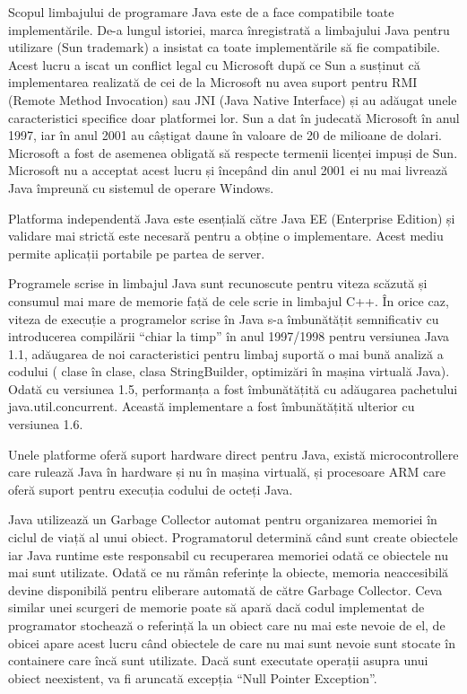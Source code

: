\documentclass[12pt]{book}
\begin{document}
Scopul limbajului de programare Java este de a face compatibile toate implementările. De-a lungul istoriei, marca înregistrată a limbajului Java pentru utilizare (Sun trademark) a insistat ca toate implementările să fie compatibile. Acest lucru a iscat un conflict legal cu Microsoft după ce Sun a susținut că implementarea realizată de cei de la Microsoft nu avea suport pentru RMI (Remote Method Invocation) sau JNI (Java Native Interface) și au adăugat unele caracteristici specifice doar platformei lor. Sun a dat în judecată Microsoft în anul 1997, iar în anul 2001 au câștigat daune în valoare de 20 de milioane de dolari. Microsoft a fost de asemenea obligată să respecte termenii licenței impuși de Sun. Microsoft nu a acceptat acest lucru și începând din anul 2001 ei nu mai livrează Java împreună cu sistemul de operare Windows.

Platforma independentă Java este esențială către Java EE (Enterprise Edition) și validare mai strictă este necesară pentru a obține o implementare. Acest mediu permite aplicații portabile pe partea de server.

Programele scrise in limbajul Java sunt recunoscute pentru viteza scăzută și consumul mai mare de memorie față de cele scrie in limbajul C++. În orice caz, viteza de execuție a programelor scrise în Java s-a îmbunătățit semnificativ cu introducerea compilării “chiar la timp” în anul 1997/1998 pentru versiunea Java 1.1, adăugarea de noi caracteristici pentru limbaj suportă o mai bună analiză a codului ( clase în clase, clasa StringBuilder, optimizări în mașina virtuală Java). Odată cu versiunea 1.5, performanța a fost îmbunătățită cu adăugarea pachetului java.util.concurrent. Această implementare a fost îmbunătățită ulterior cu versiunea 1.6.

Unele platforme oferă suport hardware direct pentru Java, există microcontrollere care rulează Java în hardware și nu în mașina virtuală, și procesoare ARM care oferă suport pentru execuția codului de octeți Java.

Java utilizează un Garbage Collector automat pentru organizarea memoriei în ciclul de viață al unui obiect. Programatorul determină când sunt create obiectele iar Java runtime este responsabil cu recuperarea memoriei odată ce obiectele nu mai sunt utilizate. Odată ce nu rămân referințe la obiecte, memoria neaccesibilă devine disponibilă pentru eliberare automată de către Garbage Collector. Ceva similar unei scurgeri de memorie poate să apară dacă codul implementat de programator stochează o referință la un obiect care nu mai este nevoie de el, de obicei apare acest lucru când obiectele de care nu mai sunt nevoie sunt stocate în containere care încă sunt utilizate. Dacă sunt executate operații asupra unui obiect neexistent, va fi aruncată excepția “Null Pointer Exception”. 
\end{document}
